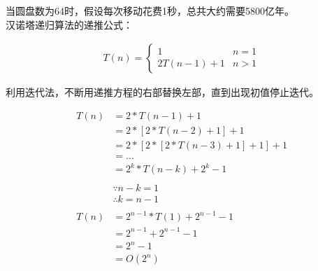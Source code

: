 当圆盘数为64时，假设每次移动花费1秒，总共大约需要5800亿年。\\

汉诺塔递归算法的递推公式：

\vspace{-0.5cm}

\begin{align*}
	T(n) = \begin{cases}
		1             & n = 1 \\
		2T(n - 1) + 1 & n > 1
	\end{cases}
\end{align*}

利用迭代法，不断用递推方程的右部替换左部，直到出现初值停止迭代。

\vspace{-1cm}

\begin{align*}
	T(n) & = 2 * T(n - 1) + 1                     \\
	     & = 2 * [ 2 * T(n - 2) + 1] + 1          \\
	     & = 2 * [2 * [2 * T(n - 3) + 1] + 1] + 1 \\
	     & = \dots                                \\
	     & = 2^k * T(n - k) + 2^k - 1             \\
	\\
	     & \because n - k = 1                     \\
	     & \therefore k = n - 1                   \\
	\\
	T(n) & = 2^{n-1} * T(1) + 2^{n-1} - 1         \\
	     & = 2^{n-1} + 2^{n-1} - 1                \\
	     & = 2^n - 1                              \\
	     & = O(2^n)
\end{align*}

